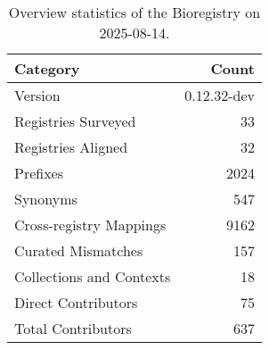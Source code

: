 \begin{table}
\caption{Overview statistics of the Bioregistry on 2025-08-14.}
\label{tab:bioregistry-summary}
\begin{tabular}{lr}
\toprule
Category & Count \\
\midrule
Version & 0.12.32-dev \\
Registries Surveyed & 33 \\
Registries Aligned & 32 \\
Prefixes & 2024 \\
Synonyms & 547 \\
Cross-registry Mappings & 9162 \\
Curated Mismatches & 157 \\
Collections and Contexts & 18 \\
Direct Contributors & 75 \\
Total Contributors & 637 \\
\bottomrule
\end{tabular}
\end{table}
